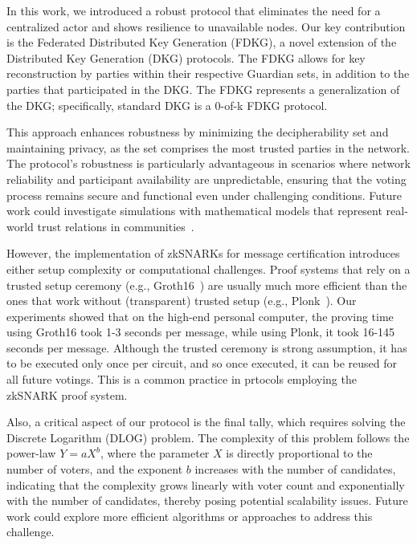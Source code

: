 \documentclass[runningheads]{llncs}
\begin{document}
In this work, we introduced a robust protocol that eliminates the need for a centralized actor and shows resilience to unavailable nodes. Our key contribution is the Federated Distributed Key Generation (FDKG), a novel extension of the Distributed Key Generation (DKG) protocols. The FDKG allows for key reconstruction by parties within their respective Guardian sets, in addition to the parties that participated in the DKG. The FDKG represents a generalization of the DKG; specifically, standard DKG is a 0-of-k FDKG protocol. 


This approach enhances robustness by minimizing the decipherability set and maintaining privacy, as the set comprises the most trusted parties in the network. The protocol's robustness is particularly advantageous in scenarios where network reliability and participant availability are unpredictable, ensuring that the voting process remains secure and functional even under challenging conditions. Future work could investigate simulations with mathematical models that represent real-world trust relations in communities~\cite{healdMathematicalDescriptionTrust2019}.

However, the implementation of zkSNARKs for message certification introduces either setup complexity or computational challenges. Proof systems that rely on a trusted setup ceremony (e.g., Groth16~\cite{grothSizePairingbasedNoninteractive2016}) are usually much more efficient than the ones that work without (transparent) trusted setup (e.g., Plonk~\cite{gabizonPlonkPermutationsLagrangebases2019a}). Our experiments showed that on the high-end personal computer, the proving time using Groth16 took 1-3 seconds per message, while using Plonk, it took 16-145 seconds per message. Although the trusted ceremony is strong assumption, it has to be executed only once per circuit, and so once executed, it can be reused for all future votings. This is a common practice in prtocols employing the zkSNARK proof system.

Also, a critical aspect of our protocol is the final tally, which requires solving the Discrete Logarithm (DLOG) problem. The complexity of this problem follows the power-law \( Y = aX^b \), where the parameter \( X \) is directly proportional to the number of voters, and the exponent \( b \) increases with the number of candidates, indicating that the complexity grows linearly with voter count and exponentially with the number of candidates, thereby posing potential scalability issues. Future work could explore more efficient algorithms or approaches to address this challenge.
\end{document}
